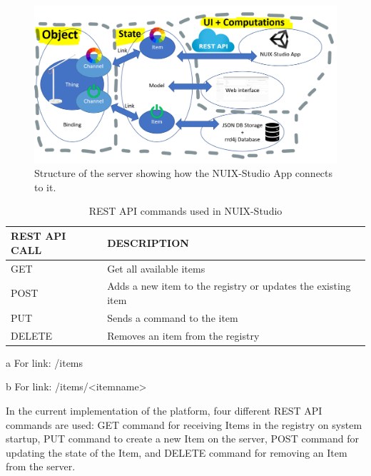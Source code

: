\begin{figure}
  \centering
  \includegraphics[width=0.9\linewidth]{figures/ExtendedServerStructure.png}
  \caption{Structure of the server showing how the NUIX-Studio App connects to it.}
  \label{fig:ExtendedServerStructure-figure}
\end{figure}

\begin{table}
  \centering
  \begin{threeparttable}[c]
    \caption{REST API commands used in NUIX-Studio}
    \label{tab:rest-api-table}
    \begin{tabular}{ll}
      \toprule
      REST API CALL    &         DESCRIPTION                 \\
      \midrule
      GET\tnote{a} & Get all available items \\
      POST\tnote{b} & Adds a new item to the registry or updates the existing item    \\
      PUT\tnote{b}        & Sends a command to the item                              \\
      DELETE\tnote{b}        & Removes an item from the registry          \\
      \bottomrule
    \end{tabular}
    \begin{tablenotes}
      \item [a] For link: /items
      \item [b] For link: /items/<itemname>
    \end{tablenotes}
  \end{threeparttable}
\end{table}

In the current implementation of the platform, four different REST API commands are used: GET command for receiving Items in the registry on system startup, PUT command to create a new Item on the server, POST command for updating the state of the Item, and DELETE command for removing an Item from the server.

